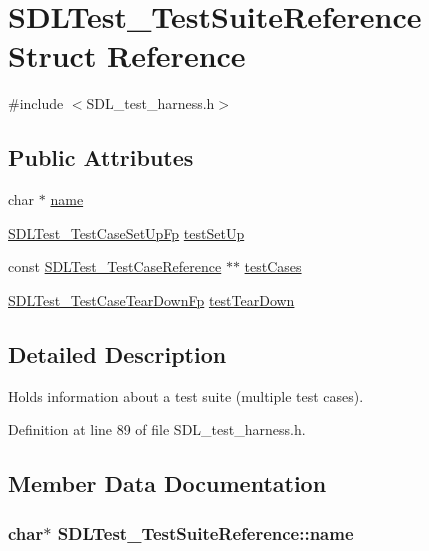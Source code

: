 \hypertarget{struct_s_d_l_test___test_suite_reference}{\section{S\-D\-L\-Test\-\_\-\-Test\-Suite\-Reference Struct Reference}
\label{struct_s_d_l_test___test_suite_reference}
}


{\ttfamily \#include $<$S\-D\-L\-\_\-test\-\_\-harness.\-h$>$}

\subsection*{Public Attributes}
\begin{DoxyCompactItemize}
\item 
char $\ast$ \hyperlink{struct_s_d_l_test___test_suite_reference_a8b002d932f91b321b384e59ae17f8f39}{name}
\item 
\hyperlink{_s_d_l__test__harness_8h_ac995a74bcb5eedd4aa06e888ae522862}{S\-D\-L\-Test\-\_\-\-Test\-Case\-Set\-Up\-Fp} \hyperlink{struct_s_d_l_test___test_suite_reference_a8aa788b982efb93c93c2ab01202e0007}{test\-Set\-Up}
\item 
const \hyperlink{struct_s_d_l_test___test_case_reference}{S\-D\-L\-Test\-\_\-\-Test\-Case\-Reference} $\ast$$\ast$ \hyperlink{struct_s_d_l_test___test_suite_reference_a06d97ce5bcf9ceb1300cc4aa39c028d3}{test\-Cases}
\item 
\hyperlink{_s_d_l__test__harness_8h_ab5047d0e13a626b93d696e06cfa748fd}{S\-D\-L\-Test\-\_\-\-Test\-Case\-Tear\-Down\-Fp} \hyperlink{struct_s_d_l_test___test_suite_reference_ad66abaf20653fd7361d28c69f88ac702}{test\-Tear\-Down}
\end{DoxyCompactItemize}


\subsection{Detailed Description}
Holds information about a test suite (multiple test cases). 

Definition at line 89 of file S\-D\-L\-\_\-test\-\_\-harness.\-h.



\subsection{Member Data Documentation}
\hypertarget{struct_s_d_l_test___test_suite_reference_a8b002d932f91b321b384e59ae17f8f39}{
\subsubsection[{name}]{\setlength{\rightskip}{0pt plus 5cm}char$\ast$ S\-D\-L\-Test\-\_\-\-Test\-Suite\-Reference\-::name}}\label{struct_s_d_l_test___test_suite_reference_a8b002d932f91b321b384e59ae17f8f39}


